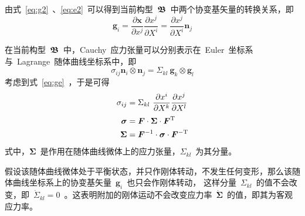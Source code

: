由式~\eqref{eq:g2}~、\eqref{eq:e2}~可以得到当前构型~$\bm{\mathfrak{B}}$~中两个协变基矢量的转换关系，即
\begin{equation}\label{eq:ge}
	\bm{g}_i = \frac{\partial \bm{x}}{\partial x^j} \frac{\partial x^j}{\partial X^i} =
	\frac{\partial x^j}{\partial X^i} \bm{n}_j
\end{equation}

在当前构型~$\bm{\mathfrak{B}}$~中，Cauchy~应力张量可以分别表示在~Euler~坐标系与~Lagrange~随体曲线坐标系中，即
\begin{equation}\label{eq:cauchy_EL}
	\sigma_{ij} \bm{n}_i \otimes \bm{n}_j = \Sigma_{kl} ~ \bm{g}_k \otimes \bm{g}_l
\end{equation}
考虑到式~\eqref{eq:ge}~，于是可得
\begin{subequations}\label{eq:cauchy_EL2}
\begin{align}
	\sigma_{ij} & = \Sigma_{kl} ~\frac{\partial x^i}{\partial X^k} \frac{\partial x^j}{\partial X^l} \label{eq:cauchy_EL22} \\[3pt]
	\bm{\sigma} & = \bm{F} \cdot \bm{\Sigma} \cdot \bm{F}^{\mathrm{T}} \label{eq:cauchy_EL3} \\
	\bm{\Sigma} & = \bm{F}^{-1} \cdot \bm{\sigma} \cdot \bm{F}^{-\mathrm{T}}
\end{align}
\end{subequations}
式中，$\bm{\Sigma}$~是作用在随体曲线微体上的应力张量，$\Sigma_{kl}$~为其分量。

假设该随体曲线微体处于平衡状态，并只作刚体转动，不发生任何变形，那么该随体曲线坐标系上的协变基矢量~$\bm{g}_i$~也只会作刚体转动，
这样分量~$\Sigma_{kl}$~的值不会改变，即~$\dot{\Sigma}_{kl}=0$~。这表明附加的刚体运动不会改变应力率~$\dot{\bm{\Sigma}}$~的值，即其为客观应力率。


